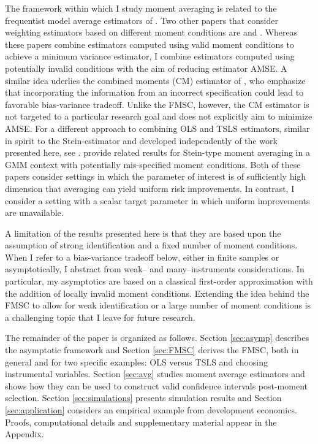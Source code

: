 The framework within which I study moment averaging is related to the frequentist model average estimators of \cite{HjortClaeskens}.
Two other papers that consider weighting estimators based on different moment conditions are \cite{Xiao} and \cite{ChenChavezLinton}.
Whereas these papers combine estimators computed using valid moment conditions to achieve a minimum variance estimator, I combine estimators computed using potentially invalid conditions with the aim of reducing estimator AMSE.
A similar idea uderlies the combined moments (CM) estimator of \cite{Judge2007}, who emphasize that incorporating the information from an incorrect specification could lead to favorable bias-variance tradeoff. 
Unlike the FMSC, however, the CM estimator is not targeted to a particular research goal and does not explicitly aim to minimize AMSE.
For a different approach to combining OLS and TSLS estimators, similar in spirit to the Stein-estimator and developed independently of the work presented here, see \cite{HansenStein}. 
\cite{ChengLiaoShi} provide related results for Stein-type moment averaging in a GMM context with potentially mis-specified moment conditions.
Both of these papers consider settings in which the parameter of interest is of sufficiently high dimension that averaging can yield uniform risk improvements.
In contrast, I consider a setting with a scalar target parameter in which uniform improvements are unavailable.

A limitation of the results presented here is that they are based upon the assumption of strong identification and a fixed number of moment conditions.
When I refer to a bias-variance tradeoff below, either in finite samples or asymptotically, I abstract from weak-- and many--instruments considerations.
In particular, my asymptotics are based on a classical first-order approximation with the addition of locally invalid moment conditions.
Extending the idea behind the FMSC to allow for weak identification or a large number of moment conditions is a challenging topic that I leave for future research.

The remainder of the paper is organized as follows.
Section \ref{sec:asymp} describes the asymptotic framework and Section \ref{sec:FMSC} derives the FMSC, both in general and for two specific examples: OLS versus TSLS and choosing instrumental variables.
Section \ref{sec:avg} studies moment average estimators and shows how they can be used to construct valid confidence intervals post-moment selection.
Section \ref{sec:simulations} presents simulation results and Section \ref{sec:application} considers an empirical example from development economics.
Proofs, computational details and supplementary material appear in the Appendix. 
